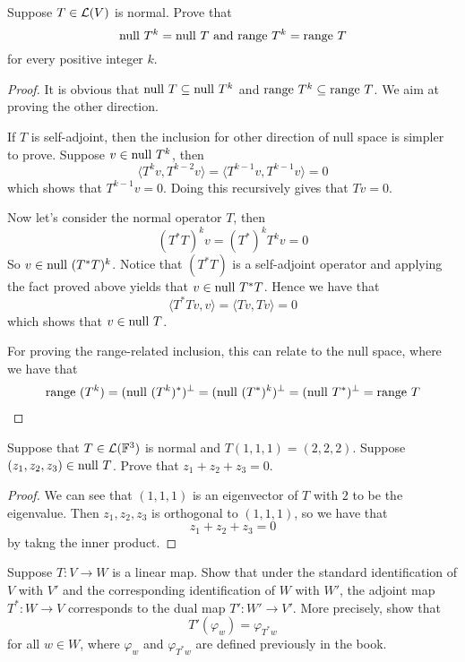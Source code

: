 \documentclass{extarticle}
\begin{document}
\begin{problem}{27}
    Suppose \(T \in \mathcal{L}(V)\) is normal. Prove that 
    \[\text{null } T^k = \text{null } T \text{ and } \text{range } T^k = \text{range } T\]
    for every positive integer \(k\).
\end{problem}


\begin{proof}

It is obvious that \(\text{null } T \subseteq \text{null } T^k\) and \(\text{range } T^k \subseteq 
\text{range } T\). We aim at proving the other direction. 

If \(T\) is self-adjoint, then the inclusion for other direction of null space is simpler to prove. 
Suppose \(v \in \text{null } T^k\), then 
\[\langle T^k v, T^{k-2} v \rangle = \langle T^{k-1} v, T^{k-1}v \rangle = 0\]
which shows that \(T^{k-1} v= 0\). Doing this recursively gives that \(T v = 0\). 

Now let's consider the normal operator \(T\), then 
\[(T^* T)^k v = (T^*)^k T^k v = 0\]
So \(v \in \text{null } (T^* T)^k\). Notice that \((T^* T)\) is a self-adjoint operator and applying the fact 
proved above yields that \(v \in \text{null } T^* T \). Hence we have that 
\[\langle T^* Tv,v \rangle = \langle Tv, Tv \rangle = 0\]
which shows that \(v \in \text{null } T\). 

For proving the range-related inclusion, this can relate to the null space, where we have that 
\begin{align*}
    \text{range } (T^k) = (\text{null } (T^k)^*)^\perp = (\text{null } (T^*)^k)^\perp = (\text{null } T^*)^\perp = \text{range } T  
\end{align*}

\end{proof}



\begin{problem}{30}
    Suppose that \(T \in \mathcal{L}(\mathbb{F}^3)\) is normal and \(T(1, 1 ,1) = (2, 2, 2)\). Suppose 
    \((z_1, z_2, z_3) \in \text{null } T\). Prove that \(z_1 + z_2 + z_3 = 0\).
\end{problem}

\begin{proof}
We can see that \((1,1,1)\) is an eigenvector of \(T\) with \(2\) to be the eigenvalue. Then 
\(z_1, z_2, z_3\) is orthogonal to \((1,1,1)\), so we have that 
\[z_1 + z_2 + z_3 = 0\]
by takng the inner product. 
\end{proof}


\begin{problem}{32}
    Suppose \(T \colon V \to W\) is a linear map. Show that under the standard identification of 
    \(V\) with \(V'\) and the corresponding identification of \(W\) with \(W'\), the adjoint map 
    \(T^* \colon W \to V\) corresponds to the dual map \(T' \colon W' \to V'\). More precisely, show 
    that 
    \[T'(\varphi_w) = \varphi_{T^* w}\] 
    for all \(w \in W\), where \(\varphi_w\) and \(\varphi_{T^* w}\) are defined previously in the 
    book. 
\end{problem}
\end{document}
